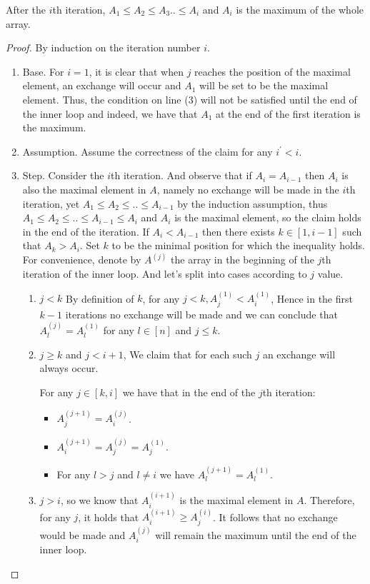 \begin{claim}
  \label{claim:first}
  After the $i$th iteration, $A_{1} \le A_{2} \le A_{3} .. \le A_{i}$ and $A_{i}$ is the maximum of the whole array. 
\end{claim}
\begin{proof}
  By induction on the iteration number $i$. 
  \begin{enumerate}
    \item Base. For $i=1$, it is clear that when $j$ reaches the position of the maximal element, an exchange will occur and $A_{1}$ will be set to be the maximal element. Thus, the condition on line (3) will not be satisfied until the end of the inner loop and indeed, we have that $A_{1}$ at the end of the first iteration is the maximum.
    \item Assumption. Assume the correctness of the claim for any $i^{\prime} < i$. 
    \item Step. Consider the $i$th iteration. And observe that if $A_{i} = A_{i-1}$ then $A_{i}$ is also the maximal element in $A$, namely no exchange will be made in the $i$th iteration, yet $A_{1} \le A_{2} \le .. \le A_{i-1}$ by the induction assumption, thus  $A_{1} \le A_{2} \le .. \le A_{i-1} \le A_{i}$ and $A_{i}$ is the maximal element, so the claim holds in the end of the iteration. 
      If $A_{i} < A_{i-1}$ then there exists $k \in [1,i-1]$ such that $A_{k} > A_{i}$. Set $k$ to be the minimal position for which the inequality holds. For convenience, denote by $A^{(j)}$ the array in the beginning of the $j$th iteration of the inner loop. And let's split into cases according to $j$ value. 
      \begin{enumerate}
        \item $j < k$ By definition of $k$, for any $j < k, A^{(1)}_{j} < A^{(1)}_{i}$, Hence in the first $k-1$ iterations no exchange will be made and we can conclude that $A^{(j)}_{l} = A^{(1)}_{l}$ for any $l \in [n]$ and $j \le k$. 
        \item $j \ge k$ and $j<i+1$, We claim that for each such $j$ an exchange will always occur. 
          \begin{claim}
            \label{claim:second}
            For any $j \in [k,i]$ we have that in the end of the $j$th iteration:  
            \begin{itemize}
              \item $A^{(j+1)}_{j} = A^{(j)}_{i}$.
              \item $A^{(j+1)}_{i} = A^{(j)}_{j} = A^{(1)}_{j}$.
              \item For any $l > j$ and $l \neq i$ we have $A^{(j+1)}_{l} = A^{(1)}_{l}$.
            \end{itemize}
          \end{claim}

  \item $j > i$, so we know that $A^{(i+1)}_{i}$ is the maximal element in $A$. Therefore, for any $j$, it holds that $A^{(i+1)}_{i}\ge A^{(i)}_{j}$. It follows that no exchange would be made and $A^{(j)}_{i}$ will remain the maximum until the end of the inner loop.    
\end{enumerate}
\end{enumerate}
  \end{proof}
